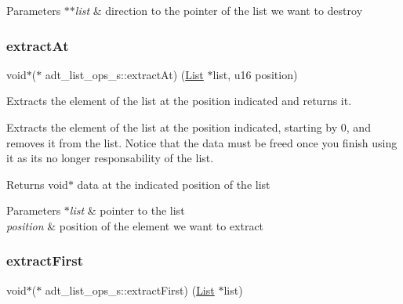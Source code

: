 \begin{DoxyParams}{Parameters}
{\em $\ast$$\ast$list} & direction to the pointer of the list we want to destroy \\
\hline
\end{DoxyParams}
\mbox{\label{structadt__list__ops__s_a7178d173e7b2922d00b96063b85067ff}} 
\subsubsection{\texorpdfstring{extract\+At}{extractAt}}
{\footnotesize\ttfamily void$\ast$($\ast$ adt\+\_\+list\+\_\+ops\+\_\+s\+::extract\+At) (\hyperlink{structadt__list__s}{List} $\ast$list, u16 position)}



Extracts the element of the list at the position indicated and returns it. 

Extracts the element of the list at the position indicated, starting by 0, and removes it from the list. Notice that the data must be freed once you finish using it as it\textquotesingle{}s no longer responsability of the list.

\begin{DoxyReturn}{Returns}
void$\ast$ data at the indicated position of the list 
\end{DoxyReturn}

\begin{DoxyParams}{Parameters}
{\em $\ast$list} & pointer to the list \\
\hline
{\em position} & position of the element we want to extract \\
\hline
\end{DoxyParams}
\mbox{\label{structadt__list__ops__s_a84ed69b1f4f4b98d6725d1f539145af2}} 
\subsubsection{\texorpdfstring{extract\+First}{extractFirst}}
{\footnotesize\ttfamily void$\ast$($\ast$ adt\+\_\+list\+\_\+ops\+\_\+s\+::extract\+First) (\hyperlink{structadt__list__s}{List} $\ast$list)}



